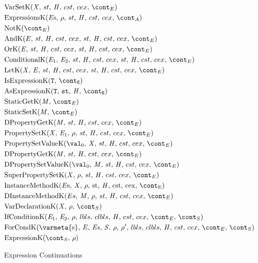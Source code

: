 \documentclass[a4paper,oneside]{article}
\begin{document}
\newcommand{\InitializerK}[4]{\mathrm{InitializerK}({#1},\,{#2},\,{#3},\,\strace,\,\handler,\,\cstrace,\,\cex,\,{#4})}
\newcommand{\InitK}[3]{\mathrm{InitiK}({#1},\,{#2},\,\strace,\,\handler,\,\cstrace,\,\cex,\,{#3})}
\newcommand{\FinallyK}[1]{\mathrm{Finally}({#1},\,\env,\,\lbls,\,\clbls,\,\strace,\,\handler,\,\econt)}
\newcommand{\FinallyReturnK}[1]{\mathrm{FinallyReturnK}({#1},\,\env,\,\lbls,\,\clbls,\,\strace,\,\handler,\,\econt)}
%
%
\newcommand{\ForCondK}{\mathrm{ForCondK}(\mathrm{\varmeta{s}},\, \expressionmeta,\, \exprs,\, \statementmeta,\, \env,\, \env',\, \lbls,\, \clbls,\, \handler,\, \cstrace,\, \cex,\, \econt,\, \scont)}
\newcommand{\ExpressionK}[2]{\mathrm{ExpressionK}({#1},\,{#2})}
\begin{figure}[Htp]
  \begin{align}
    &\VarSetK{\idmeta}{\ExceptionHandlers}{\econt} \label{econt:varset}\\
    &\ExpressionsK{\exprs}{\env}{\acont} \label{econt:expressions}\\
    &\NotK{\econt} \label{econt:not}\\
    &\AndK{\expressionmeta}{\ExceptionHandlers}{\econt} \label{econt:and}\\
    &\OrK{\expressionmeta}{\ExceptionHandlers}{\econt} \label{econt:or}\\
    &\ConditionalK{\expressionmeta_1}{\expressionmeta_2}{\ExceptionHandlers}{\econt} \label{econt:cond}\\
    &\LetK{\idmeta}{\expressionmeta}{\ExceptionHandlers}{\econt} \label{econt:let}\\
    &\IsExpressionK \label{econt:is}\\
    &\AsExpressionK \label{econt:as}\\
    &\StaticGetK \label{econt:static-get}\\
    &\StaticSetK \label{econt:static-set}\\
    &\DPropertyGetK \label{econt:dproperty-get}\\
    &\PropertySetK \label{econt:property-set}\\
    &\PropertySetVK \label{econt:property-set}\\
    &\DPropertyGetK \label{econt:dproperty-set}\\
    &\DPropertySetVK \label{econt:dproperty-set-v}\\
    &\SuperPropertySetK \label{econt:super-property-set}\\
    &\InstanceMethodK \label{econt:instance-method}\\
    &\DInstanceMethodK \label{econt:dinstance-method}\\
    &\VarDeclK{\idmeta}{\env}{\scont} \label{econt:var-decl}\\
    &\IfCondK{\expressionmeta_1}{\expressionmeta_2} \label{econt:if-cond}\\
    &\ForCondK \label{econt:for-cond}\\
    &\ExpressionK{\scont}{\env} \label{econt:expression}
  \end{align}
  \caption{Expression Continuations}
  \label{figure:econts}
\end{figure}
\end{document}
